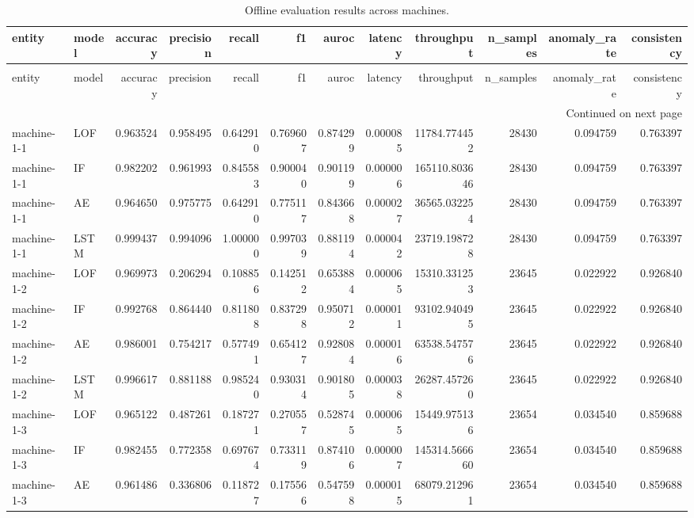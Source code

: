 \begin{longtable}{llrrrrrrrrrr}
\caption{Offline evaluation results across machines.} \label{tab:offline-results} \\
\toprule
entity & model & accuracy & precision & recall & f1 & auroc & latency & throughput & n_samples & anomaly_rate & consistency \\
\midrule
\endfirsthead
\caption[]{Offline evaluation results across machines.} \\
\toprule
entity & model & accuracy & precision & recall & f1 & auroc & latency & throughput & n_samples & anomaly_rate & consistency \\
\midrule
\endhead
\midrule
\multicolumn{12}{r}{Continued on next page} \\
\midrule
\endfoot
\bottomrule
\endlastfoot
machine-1-1 & LOF & 0.963524 & 0.958495 & 0.642910 & 0.769607 & 0.874299 & 0.000085 & 11784.774452 & 28430 & 0.094759 & 0.763397 \\
machine-1-1 & IF & 0.982202 & 0.961993 & 0.845583 & 0.900040 & 0.901199 & 0.000006 & 165110.803646 & 28430 & 0.094759 & 0.763397 \\
machine-1-1 & AE & 0.964650 & 0.975775 & 0.642910 & 0.775117 & 0.843668 & 0.000027 & 36565.032254 & 28430 & 0.094759 & 0.763397 \\
machine-1-1 & LSTM & 0.999437 & 0.994096 & 1.000000 & 0.997039 & 0.881194 & 0.000042 & 23719.198728 & 28430 & 0.094759 & 0.763397 \\
machine-1-2 & LOF & 0.969973 & 0.206294 & 0.108856 & 0.142512 & 0.653884 & 0.000065 & 15310.331253 & 23645 & 0.022922 & 0.926840 \\
machine-1-2 & IF & 0.992768 & 0.864440 & 0.811808 & 0.837298 & 0.950712 & 0.000011 & 93102.940495 & 23645 & 0.022922 & 0.926840 \\
machine-1-2 & AE & 0.986001 & 0.754217 & 0.577491 & 0.654127 & 0.928084 & 0.000016 & 63538.547576 & 23645 & 0.022922 & 0.926840 \\
machine-1-2 & LSTM & 0.996617 & 0.881188 & 0.985240 & 0.930314 & 0.901805 & 0.000038 & 26287.457260 & 23645 & 0.022922 & 0.926840 \\
machine-1-3 & LOF & 0.965122 & 0.487261 & 0.187271 & 0.270557 & 0.528745 & 0.000065 & 15449.975136 & 23654 & 0.034540 & 0.859688 \\
machine-1-3 & IF & 0.982455 & 0.772358 & 0.697674 & 0.733119 & 0.874106 & 0.000007 & 145314.566660 & 23654 & 0.034540 & 0.859688 \\
machine-1-3 & AE & 0.961486 & 0.336806 & 0.118727 & 0.175566 & 0.547598 & 0.000015 & 68079.212961 & 23654 & 0.034540 & 0.859688 \\

\end{longtable}
